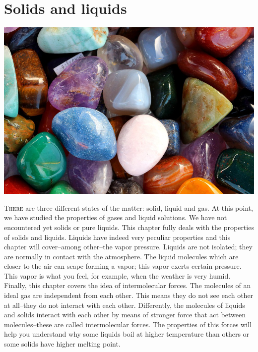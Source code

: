 \documentclass[main.tex]{subfiles}
\begin{document}
\linenumbers
  

\chapter[Solids and liquids]{Solids and liquids}

\begin{marginfigure}
      \includegraphics{chapter14/figure1}

   \end{marginfigure}
\lettrine[lines=4]{\color{black!45}T}{here} are three different states of the matter: solid, liquid and gas. At this point, we have studied the properties of gases and liquid solutions. We have not encountered yet solids or pure liquids. This chapter fully deals with the properties of solids and liquids. Liquids have indeed very peculiar properties and this chapter will cover--among other--the vapor pressure. Liquids are not isolated; they are normally in contact with the atmosphere. The liquid molecules which are closer to the air can scape forming a vapor; this vapor exerts certain pressure. This vapor is what you feel, for example, when the weather is very humid. Finally, this chapter covers the idea of intermolecular forces. The molecules of an ideal gas are independent from each other. This means they do not see each other at all--they do not interact with each other. Differently, the molecules of liquids and solids interact with each other by means of stronger force that act between molecules--these are called intermolecular forces. The properties of this forces will help you understand why some liquids boil at higher temperature than others or some solids have higher melting point. 
 
\end{document}

